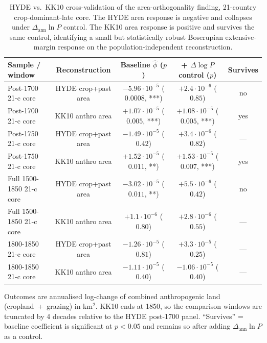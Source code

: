 \documentclass[11pt,letterpaper]{article}
\begin{document}
\begin{table}[H]
\centering
\caption{HYDE vs.\ KK10 cross-validation of the area-orthogonality finding, 21-country crop-dominant-late core. The HYDE area response is negative and collapses under $\Delta_{\text{ann}} \ln P$ control. The KK10 area response is positive and survives the same control, identifying a small but statistically robust Boserupian extensive-margin response on the population-independent reconstruction.}
\label{tab:kk10-orthogonality}
\small
\begin{tabular}{lcccc}
\toprule
Sample / window & Reconstruction & Baseline $\hat\phi$ ($p$) & + $\Delta \log P$ control ($p$) & Survives \\
\midrule
Post-1700 21-c core & HYDE crop+past area & $-5.96\!\cdot\!10^{-5}$ ($0.0008$, ***) & $+2.4\!\cdot\!10^{-6}$ ($0.85$) & no \\
Post-1700 21-c core & KK10 anthro area    & $+1.07\!\cdot\!10^{-5}$ ($0.005$, ***)  & $+1.08\!\cdot\!10^{-5}$ ($0.005$, ***) & yes \\
\midrule
Post-1750 21-c core & HYDE crop+past area & $-1.49\!\cdot\!10^{-5}$ ($0.42$)        & $+3.4\!\cdot\!10^{-6}$ ($0.82$) & --- \\
Post-1750 21-c core & KK10 anthro area    & $+1.52\!\cdot\!10^{-5}$ ($0.011$, **)   & $+1.53\!\cdot\!10^{-5}$ ($0.007$, ***) & yes \\
\midrule
Full 1500-1850 21-c core & HYDE crop+past area & $-3.02\!\cdot\!10^{-5}$ ($0.011$, **) & $+5.5\!\cdot\!10^{-6}$ ($0.42$) & no \\
Full 1500-1850 21-c core & KK10 anthro area    & $+1.1\!\cdot\!10^{-6}$ ($0.80$)       & $+2.8\!\cdot\!10^{-6}$ ($0.55$) & --- \\
\midrule
1800-1850 21-c core & HYDE crop+past area & $-1.26\!\cdot\!10^{-5}$ ($0.81$)        & $+3.3\!\cdot\!10^{-5}$ ($0.25$) & --- \\
1800-1850 21-c core & KK10 anthro area    & $-1.11\!\cdot\!10^{-5}$ ($0.40$)        & $-1.06\!\cdot\!10^{-5}$ ($0.40$) & --- \\
\bottomrule
\end{tabular}
\par\smallskip\footnotesize{Outcomes are annualised log-change of combined anthropogenic land (cropland~+~grazing) in km$^2$. KK10 ends at 1850, so the comparison windows are truncated by 4 decades relative to the HYDE post-1700 panel. ``Survives'' = baseline coefficient is significant at $p < 0.05$ and remains so after adding $\Delta_{\text{ann}} \ln P$ as a control.}
\end{table}
\end{document}
